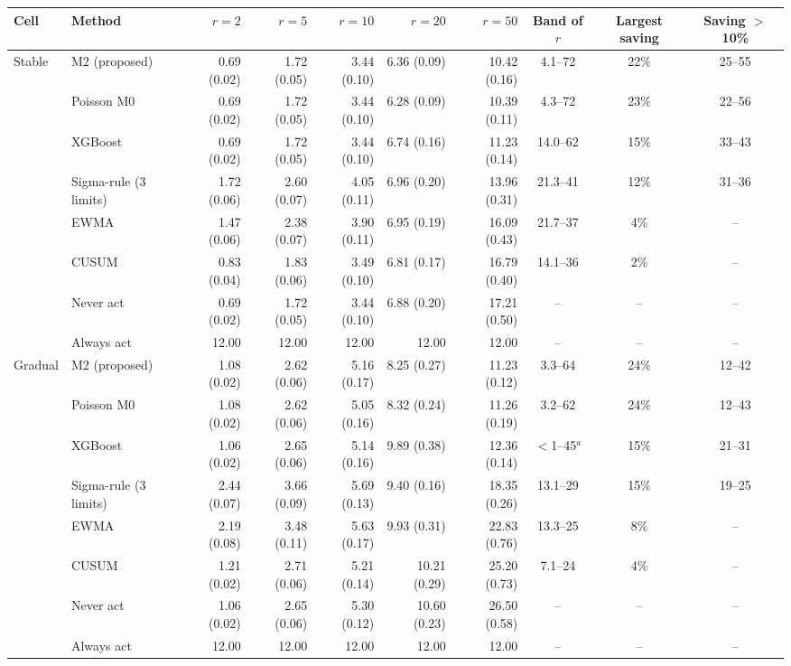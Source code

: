 {\scriptsize
\begin{tabular}{llrrrrrccc}
\toprule
Cell & Method & $r=2$ & $r=5$ & $r=10$ & $r=20$ & $r=50$ & Band of $r$ & Largest saving & Saving $>$ 10\% \\
\midrule
Stable & M2 (proposed) & 0.69 (0.02) & 1.72 (0.05) & 3.44 (0.10) & 6.36 (0.09) & 10.42 (0.16) & 4.1--72 & 22\% & 25--55 \\
 & Poisson M0 & 0.69 (0.02) & 1.72 (0.05) & 3.44 (0.10) & 6.28 (0.09) & 10.39 (0.11) & 4.3--72 & 23\% & 22--56 \\
 & XGBoost & 0.69 (0.02) & 1.72 (0.05) & 3.44 (0.10) & 6.74 (0.16) & 11.23 (0.14) & 14.0--62 & 15\% & 33--43 \\
 & Sigma-rule (3 limits) & 1.72 (0.06) & 2.60 (0.07) & 4.05 (0.11) & 6.96 (0.20) & 13.96 (0.31) & 21.3--41 & 12\% & 31--36 \\
 & EWMA & 1.47 (0.06) & 2.38 (0.07) & 3.90 (0.11) & 6.95 (0.19) & 16.09 (0.43) & 21.7--37 & 4\% & -- \\
 & CUSUM & 0.83 (0.04) & 1.83 (0.06) & 3.49 (0.10) & 6.81 (0.17) & 16.79 (0.40) & 14.1--36 & 2\% & -- \\
 & Never act & 0.69 (0.02) & 1.72 (0.05) & 3.44 (0.10) & 6.88 (0.20) & 17.21 (0.50) & -- & -- & -- \\
 & Always act & 12.00 & 12.00 & 12.00 & 12.00 & 12.00 & -- & -- & -- \\
\addlinespace
Gradual & M2 (proposed) & 1.08 (0.02) & 2.62 (0.06) & 5.16 (0.17) & 8.25 (0.27) & 11.23 (0.12) & 3.3--64 & 24\% & 12--42 \\
 & Poisson M0 & 1.08 (0.02) & 2.62 (0.06) & 5.05 (0.16) & 8.32 (0.24) & 11.26 (0.19) & 3.2--62 & 24\% & 12--43 \\
 & XGBoost & 1.06 (0.02) & 2.65 (0.06) & 5.14 (0.16) & 9.89 (0.38) & 12.36 (0.14) & $<$1--45$^{a}$ & 15\% & 21--31 \\
 & Sigma-rule (3 limits) & 2.44 (0.07) & 3.66 (0.09) & 5.69 (0.13) & 9.40 (0.16) & 18.35 (0.26) & 13.1--29 & 15\% & 19--25 \\
 & EWMA & 2.19 (0.08) & 3.48 (0.11) & 5.63 (0.17) & 9.93 (0.31) & 22.83 (0.76) & 13.3--25 & 8\% & -- \\
 & CUSUM & 1.21 (0.02) & 2.71 (0.06) & 5.21 (0.14) & 10.21 (0.29) & 25.20 (0.73) & 7.1--24 & 4\% & -- \\
 & Never act & 1.06 (0.02) & 2.65 (0.06) & 5.30 (0.12) & 10.60 (0.23) & 26.50 (0.58) & -- & -- & -- \\
 & Always act & 12.00 & 12.00 & 12.00 & 12.00 & 12.00 & -- & -- & -- \\

\end{tabular}}
